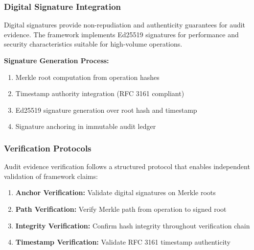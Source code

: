 \documentclass[12pt,a4paper]{article}
\begin{document}
\subsubsection{Digital Signature Integration}

Digital signatures provide non-repudiation and authenticity guarantees for audit evidence. The framework implements Ed25519 signatures for performance and security characteristics suitable for high-volume operations.

\textbf{Signature Generation Process:}
\begin{enumerate}
\item Merkle root computation from operation hashes
\item Timestamp authority integration (RFC 3161 compliant)
\item Ed25519 signature generation over root hash and timestamp
\item Signature anchoring in immutable audit ledger
\end{enumerate}

\begin{center}
\end{center}

\subsubsection{Verification Protocols}

Audit evidence verification follows a structured protocol that enables independent validation of framework claims:

\begin{enumerate}
\item \textbf{Anchor Verification:} Validate digital signatures on Merkle roots
\item \textbf{Path Verification:} Verify Merkle path from operation to signed root
\item \textbf{Integrity Verification:} Confirm hash integrity throughout verification chain
\item \textbf{Timestamp Verification:} Validate RFC 3161 timestamp authenticity
\end{enumerate}
\end{document}
